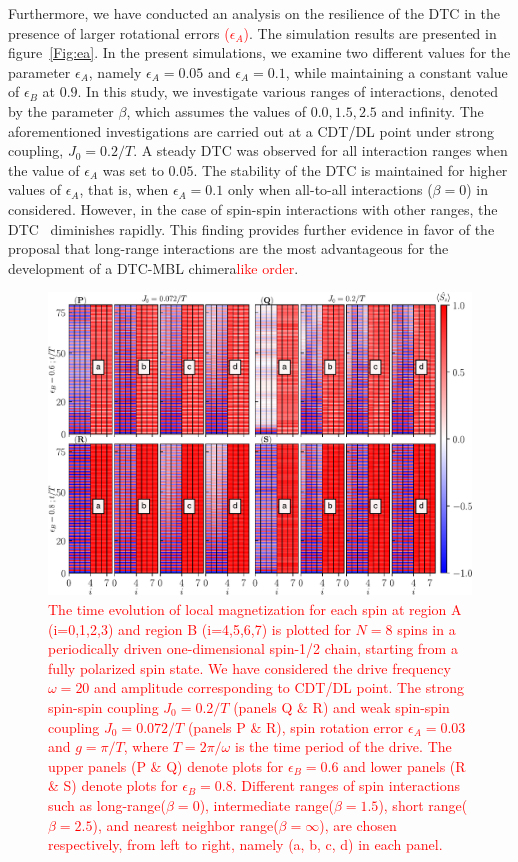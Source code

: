 \documentclass[12pt]{iopart}
\newcommand{\red}[1]{\textcolor{red}{#1}}
\begin{document}
Furthermore, we have conducted an analysis on the resilience of the DTC in the presence of larger rotational errors \red{($\epsilon_A$)}. The simulation results are presented in figure~\ref{Fig:ea}. In the present simulations, we examine two different values for the parameter $\epsilon_A$, namely $\epsilon_A = 0.05$ and $\epsilon_A = 0.1$, while maintaining a constant value of $\epsilon_B$ at $0.9$. In this study, we investigate various ranges of interactions, denoted by the parameter $\beta$, which assumes the values of $0.0, 1.5, 2.5$ and infinity. The aforementioned investigations are carried out at a CDT/DL point under strong coupling, $J_0 = 0.2/T$.  A steady DTC was observed for all interaction ranges when the value of $\epsilon_A$ was set to $0.05$. The stability of the DTC is maintained for higher values of $\epsilon_A$, that is, when $\epsilon_A = 0.1$ only when all-to-all interactions ($\beta=0$) in considered. However, in the case of spin-spin interactions with other ranges, the DTC  diminishes rapidly. This finding provides further evidence in favor of the proposal that long-range interactions are the most advantageous for the development of a DTC-MBL chimera\red{like order}.
\begin{figure}[t!]
	\centering
	\hspace{2cm}\includegraphics[width=13.5cm]{figure7.pdf}
	\caption{\red{The time evolution of local magnetization for each spin at region A (i=0,1,2,3) and region B (i=4,5,6,7) is plotted for $N=8$ spins in a periodically driven one-dimensional spin-1/2 chain, starting from a fully polarized spin state. We have considered the drive frequency $\omega=20$ and amplitude corresponding to CDT/DL point. The strong spin-spin coupling $J_0 = 0.2/T$ (panels Q \& R) and weak spin-spin coupling $J_0 = 0.072/T$ (panels P \& R),  spin rotation error $\epsilon_A = 0.03$ and $g=\pi/T$, where $T=2\pi/\omega$ is the time period of the drive. The upper panels (P \& Q) denote plots for $\epsilon_B=0.6$ and lower panels (R \& S) denote plots for $\epsilon_B=0.8$. Different ranges of spin interactions such as long-range($\beta=0$), intermediate range($\beta=1.5$), short range($\beta=2.5$), and nearest neighbor range($\beta=\infty$), are chosen respectively, from left to right, namely (a, b, c, d) in each panel.}}
	\label{Fig:eb}
\end{figure}
\end{document}
